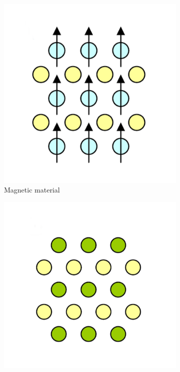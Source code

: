 \documentclass[main.tex]{subfiles}
\begin{document}
\begin{figure}[!htb]
\centering
	\begin{subfigure}[h]{0.32\textwidth}
		\centering
		\includegraphics[width=\linewidth]{dms1}
  		\caption{Magnetic material}
   		\label{fig:sub-first}
	\end{subfigure}
	\begin{subfigure}[h]{0.32\textwidth}
  		\centering
  		\includegraphics[width=\linewidth]{dms2}

\end{subfigure}
\end{figure}
\end{document}
